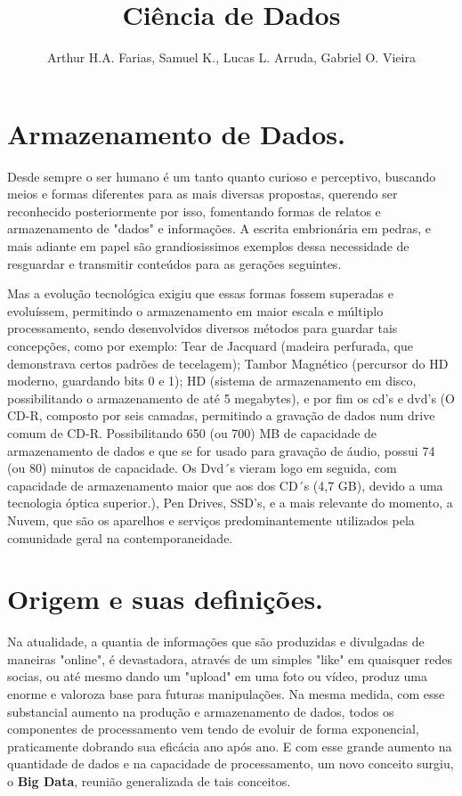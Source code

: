 \documentclass[12pt]{article}
\title{Ciência de Dados}
\author{Arthur H.A. Farias, Samuel K., Lucas L. Arruda, Gabriel O. Vieira}
\begin{document}
    \tableofcontents

\maketitle

\section{Armazenamento de Dados.}

Desde sempre o ser humano é um tanto quanto curioso e perceptivo, buscando meios e formas diferentes para as mais diversas propostas, querendo ser reconhecido posteriormente por isso, fomentando formas de relatos e armazenamento de "dados" e informações. A escrita embrionária em pedras, e mais adiante em papel são grandiosissimos exemplos dessa necessidade de resguardar e transmitir conteúdos para as gerações seguintes.

Mas a evolução tecnológica exigiu que essas formas fossem superadas e evoluíssem, permitindo o armazenamento em maior escala e múltiplo processamento, sendo desenvolvidos diversos métodos para guardar tais concepções, como por exemplo: Tear de Jacquard (madeira perfurada, que demonstrava certos padrões de tecelagem); Tambor Magnético (percursor do HD moderno, guardando bits 0 e 1); HD (sistema de armazenamento em disco, possibilitando o armazenamento de até 5 megabytes), e por fim os cd's e dvd's (O CD-R, composto por seis camadas, permitindo a gravação de dados num drive comum de CD-R. Possibilitando 650 (ou 700) MB de capacidade de armazenamento de dados e que se for usado para gravação de áudio, possui 74 (ou 80) minutos de capacidade. Os Dvd´s vieram logo em seguida, com capacidade  de armazenamento maior que aos dos CD´s (4,7 GB), devido a uma tecnologia óptica superior.), Pen Drives, SSD's, e a mais relevante do momento, a Nuvem, que são os aparelhos e serviços predominantemente utilizados pela comunidade geral na contemporaneidade. 

\section{Origem e suas definições.}

Na atualidade, a quantia de informações que são produzidas e divulgadas de maneiras "online", é devastadora, através de um simples "like" em quaisquer redes socias, ou até mesmo dando um "upload" em uma foto ou vídeo, produz uma enorme e valoroza base para futuras manipulações. Na mesma medida, com esse substancial aumento na produção e armazenamento de dados, todos os componentes de processamento vem tendo de evoluir de forma exponencial, praticamente dobrando sua eficácia ano após ano. E com esse grande aumento na quantidade de dados e na capacidade de processamento, um novo conceito surgiu, o  \textbf{Big Data}, reunião generalizada de tais conceitos.
\end{document}
